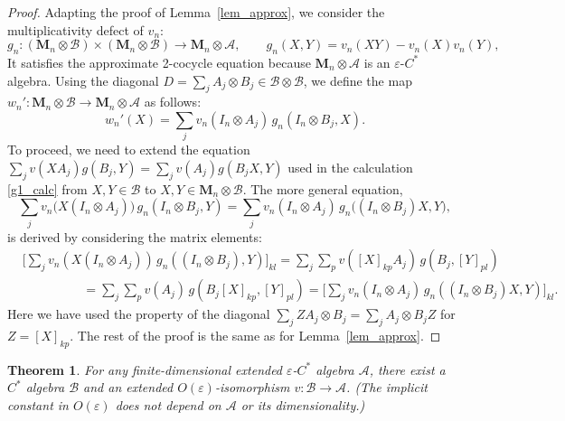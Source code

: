 \documentclass[12pt]{article}
\newcommand{\calA}{\mathcal{A}}
\newcommand{\calB}{\mathcal{B}}
\newcommand*{\Ma}[1]{\mathbf{M}_{#1}}
\newcommand{\eps}{\varepsilon}
\newtheorem{Theorem}{Theorem}[section]
\newtheorem[definition]{Definition}[Theorem]{Definition}
\newtheorem[remark]{Example}[Theorem]{Example}
\newtheorem[remark]{Remark}[Theorem]{Remark}
\newtheorem[remark]{Question}[Theorem]{Open question}
\newtheorem*[definition]{definition}{Definition}
\newtheorem*[remark]{example}{Example}
\newtheorem*[remark]{remark}{Remark}
\newtheorem*[remark]{question}{Open question}
\numberwithin{equation}{section}
\begin{document}
\begin{proof} Adapting the proof of Lemma~\ref{lem_approx}, we consider the multiplicativity defect of $v_n$:
\begin{equation}
g_n\colon (\Ma{n}\otimes\calB)\times(\Ma{n}\otimes\calB)
\to \Ma{n}\otimes\calA,\qquad g_n(X,Y)=v_n(XY)-v_n(X)v_n(Y),
\end{equation}
It satisfies the approximate 2-cocycle equation because $\Ma{n}\otimes\calA$ is an $\eps$-$C^*$ algebra. Using the diagonal $D=\sum_{j}A_j\otimes B_j \in\calB\otimes\calB$, we define the map $w_n'\colon \Ma{n}\otimes\calB \to\Ma{n}\otimes\calA$ as follows:
\begin{equation}
w_n'(X) = \sum_{j}v_n(I_n\otimes A_j)\, g_n(I_n\otimes B_j,X).
\end{equation}
To proceed, we need to extend the equation $\sum_{j}v(XA_j)g(B_j,Y)=\sum_{j}v(A_j)g(B_jX,Y)$ used in the calculation \eqref{g1_calc} from $X,Y\in\calB$ to $X,Y\in\Ma{n}\otimes\calB$. The more general equation,
\begin{equation}
\sum_{j}v_n\bigl(X(I_n\otimes A_j)\bigr)\, g_n(I_n\otimes B_j,Y)
=\sum_{j}v_n(I_n\otimes A_j)\, g_n\bigl((I_n\otimes B_j)X,Y\bigr),
\end{equation}
is derived by considering the matrix elements:
\begin{align*}
&\biggl[\sum_{j}v_n(X(I_n\otimes A_j))\,
g_n((I_n\otimes B_j),Y)\biggr]_{kl}
=\sum_{j}\sum_{p} v([X]_{kp}A_j)\, g(B_j,[Y]_{pl})\\
&\hspace{2cm}=\sum_{j}\sum_{p} v(A_j)\, g(B_j[X]_{kp},[Y]_{pl})
=\biggl[\sum_{j}v_n(I_n\otimes A_j)\,
g_n((I_n\otimes B_j)X,Y)\biggr]_{kl}.
\end{align*}
Here we have used the property of the diagonal $\sum_{j}ZA_j\otimes B_j=\sum_{j}A_j\otimes B_jZ$ for $Z=[X]_{kp}$. The rest of the proof is the same as for Lemma~\ref{lem_approx}.
\end{proof}

\begin{Theorem}\label{th_main_ext}
For any finite-dimensional extended $\eps$-$C^*$ algebra $\calA$, there exist a $C^*$ algebra $\calB$ and an extended $O(\eps)$-isomorphism $v\colon\calB\to\calA$. (The implicit constant in $O(\eps)$ does not depend on $\calA$ or its dimensionality.)
\end{Theorem}
\end{document}
